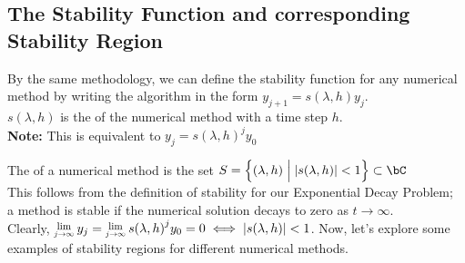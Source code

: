 \subsection{The Stability Function and corresponding Stability Region}
\par By the same methodology, we can define the stability function for any numerical method by writing the algorithm in the form $y_{j+1} = s(\lambda, h) y_{j}$.\\
$s(\lambda, h)$ is the  of the numerical method with a time step $h$.\\
\textbf{Note:} This is equivalent to $y_{j} = {s(\lambda,h)}^{j} y_0$

\par The  of a numerical method is the set $S = \Big\{ (\lambda, h) \;\Big|\; |s(\lambda, h)| < 1\Big\} \subset \bC$\\
This follows from the definition of stability for our Exponential Decay Problem;\\
a method is stable if the numerical solution decays to zero as $t \rightarrow \infty$.\\
Clearly, $\Lim{j \rightarrow \infty}y_{j} = \Lim{j \rightarrow \infty}{s(\lambda,h)}^{j} y_0 = 0 \iff |s(\lambda, h)| < 1$.
Now, let's explore some examples of stability regions for different numerical methods.

\newpage
